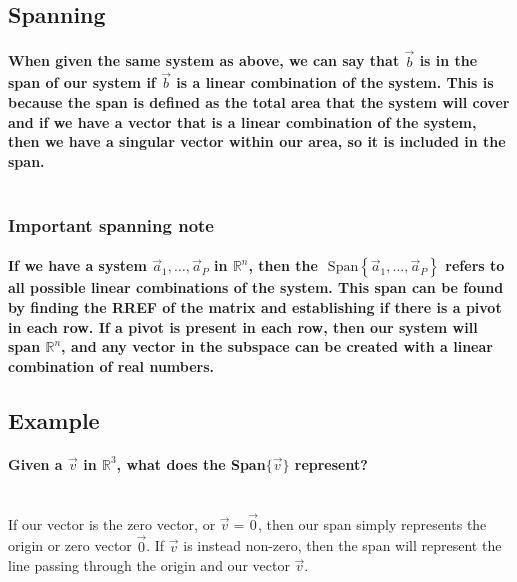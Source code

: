 \documentclass{report}
\begin{document}
\begin{multicols}{2}
\subsection{Spanning}%
\label{sub: Spanning }
\paragraph{When given the same system as above, we can say that $ \vec{ b } $ is in the span of our system if $ \vec{ b } $ is a linear combination of the system. This is because the span is defined as the total area that the system will cover and if we have a vector that is a linear combination of the system, then we have a singular vector within our area, so it is included in the span. \\ \\}

\subsubsection{Important spanning note}
\paragraph{If we have a system $ \vec{ a }_1, \ldots, \vec{ a }_P $ in $ \mathbb{R}^{ n } $, then the $ \text{ Span}\left\{\vec{ a }_1, \ldots, \vec{ a }_P \right\}$ refers to all possible linear combinations of the system. This span can be found by finding the RREF of the matrix and establishing if there is a pivot in each row. If a pivot is present in each row, then our system will span $ \mathbb{R}^{ n } $, and any vector in the subspace can be created with a linear combination of real numbers.}
\subsection{Example}%
\label{sub: Example }
\paragraph{Given a $ \vec{ v } $ in $ \mathbb{R}^{ 3 } $, what does the Span$ \{\vec{ v }\} $ represent? \\ \\}
If our vector is the zero vector, or $ \vec{ v } = \vec{ 0 } $, then our span simply represents the origin or zero vector $ \vec{ 0 } $. If $ \vec{ v } $ is instead non-zero, then the span will represent the line passing through the origin and our vector $ \vec{ v } $. 


\end{multicols}
\end{document}
